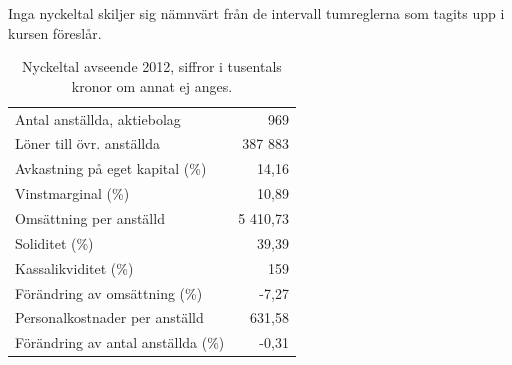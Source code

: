 \documentclass[10pt,a4paper]{article}
\begin{document}
Inga nyckeltal skiljer sig nämnvärt från de intervall tumreglerna som tagits upp i kursen föreslår.
\begin{table}[H]
	\begin{tabular}{ l r }
		Antal anställda, aktiebolag & 969\\
		Löner till övr. anställda & 387 883\\
		Avkastning på eget kapital (\%) & 14,16\\
		Vinstmarginal (\%) & 10,89\\
		Omsättning per anställd & 5 410,73\\
		Soliditet (\%) & 39,39\\
		Kassalikviditet (\%) & 159\\
		Förändring av omsättning (\%) & -7,27\\
		Personalkostnader per anställd & 631,58\\
		Förändring av antal anställda (\%) & -0,31\\

	\end{tabular}
	\caption{Nyckeltal avseende 2012, siffror i tusentals kronor om annat ej anges.}
	\label{table:nyckeltal}
\end{table}
\end{document}
